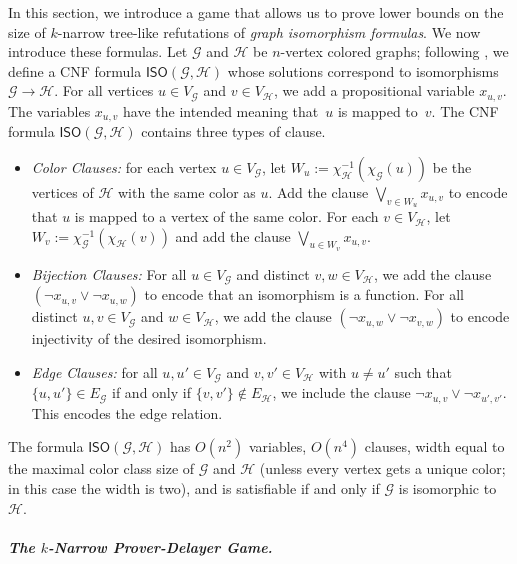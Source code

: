\documentclass[a4paper,english, thm-restate]{lipics-v2021}
\newcommand{\defining}[1]{\emph{#1}}
\newcommand{\inv}[1]{#1^{-1}}
\newcommand{\graphG}{\mathcal{G}}
\newcommand{\graphH}{\mathcal{H}}
\newcommand{\vertexG}{V_{\graphG}}
\newcommand{\vertexH}{V_{\graphH}}
\newcommand{\edgeG}{E_{\graphG}}
\newcommand{\edgeH}{E_{\graphH}}
\newcommand{\coloringG}{\chi_{\graphG}}
\newcommand{\coloringH}{\chi_{\graphH}}
\newcommand{\ISO}{\mathsf{ISO}(\graphG, \graphH)}
\begin{document}
In this section, we introduce a game that allows us to prove lower bounds on the size of $k$-narrow tree-like refutations of \defining{graph isomorphism formulas}. We now introduce these formulas.
%
Let $\graphG$ and $\graphH$ be $n$-vertex colored graphs; following
\cite{DBLP:journals/tocl/ToranW23}, we define a CNF
formula $\ISO$ whose solutions correspond to isomorphisms $\graphG \to
\graphH$. 
For all vertices $u \in \vertexG$ and $v \in \vertexH$,
we add a propositional variable $x_{u,v}$. The variables $x_{u,v}$ have the intended meaning that~$u$ is mapped to~$v$.
The CNF formula $\ISO$ contains three types of clause.
%
\begin{itemize}
\item \defining{Color Clauses:}
for each vertex $u \in \vertexG$,
let $W_u := \inv{\coloringH}(\coloringG(u))$ be the vertices of $\graphH$ with the same color as $u$.
Add
 the clause $\bigvee_{v \in W_u} x_{u,v}$ to encode that $u$ is mapped to a vertex of the same color.
 For each $v \in \vertexH$,
 let $W_v := \inv{\coloringG}(\coloringH(v))$ and add the clause $\bigvee_{u \in W_v} x_{u,v} $. 
\item \defining{Bijection Clauses:} 
For all $u\in \vertexG$ and distinct $v,w \in \vertexH$, we add the clause $(\neg x_{u,v} \vee \neg x_{u,w})$ to encode that an isomorphism is a function.
For all distinct $u,v \in \vertexG$ and $w \in \vertexH$, we add the clause $(\neg x_{u,w} \vee \neg x_{v,w})$ to encode
injectivity of the desired isomorphism. 
%

\item \defining{Edge Clauses:} for all $u,u' \in \vertexG$ and $v, v' \in \vertexH$ with $u\neq u'$ such that $\{u,u'\} \in \edgeG$ if and only if $\{v, v' \} \not \in \edgeH$, we include the 
clause $\neg x_{u,v} \vee \neg x_{u',v'}$. This encodes the edge relation.
\end{itemize}
\noindent The formula $\ISO$ has $O(n^2)$ variables, $O(n^4)$ clauses, width equal  to the maximal color class size of $\graphG$ and $\graphH$ (unless every vertex gets a unique color; in this case the width is two),
and is satisfiable if and only if $\graphG$ is isomorphic to $\graphH$.


\subparagraph*{The \texorpdfstring{$k$}{k}-Narrow Prover-Delayer Game.}
\end{document}

